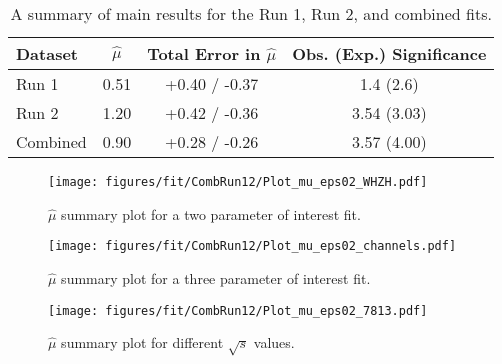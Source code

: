 \begin{table}[!htbp]
\begin{center}
\begin{tabular}{lccc} \hline\hline
Dataset & $\hat{\mu}$ & Total Error in $\hat{\mu}$ & Obs. (Exp.) Significance \\
\hline
Run 1 & 0.51 & +0.40 / -0.37 & 1.4 (2.6)\\
Run 2 & 1.20 & +0.42 / -0.36 & 3.54 (3.03)\\
Combined & 0.90 & +0.28 / -0.26 & 3.57 (4.00)\\
\hline\hline
\end{tabular}
\caption{A summary of main results for the Run 1, Run 2, and combined fits.}
\label{tableCombresykts}
\end{center}
\end{table}


\begin{figure}[tbh]
  \begin{center}
  \texttt{[image: figures/fit/CombRun12/Plot\_mu\_eps02\_WHZH.pdf]}
  \caption{$\hat{\mu}$ summary plot for a two parameter of interest fit.}
  \label{fig:combmushat1}
  \end{center}
\end{figure}
\begin{figure}[tbh]
  \begin{center}
  \texttt{[image: figures/fit/CombRun12/Plot\_mu\_eps02\_channels.pdf]}
  \caption{$\hat{\mu}$ summary plot for a three parameter of interest fit.}
  \label{fig:combmushat2}
  \end{center}
\end{figure}
\begin{figure}[tbh]
  \begin{center}
  \texttt{[image: figures/fit/CombRun12/Plot\_mu\_eps02\_7813.pdf]}
  \caption{$\hat{\mu}$ summary plot for different $\sqrt{s}$ values.}
  \label{fig:combmushat3}
  \end{center}
\end{figure}




